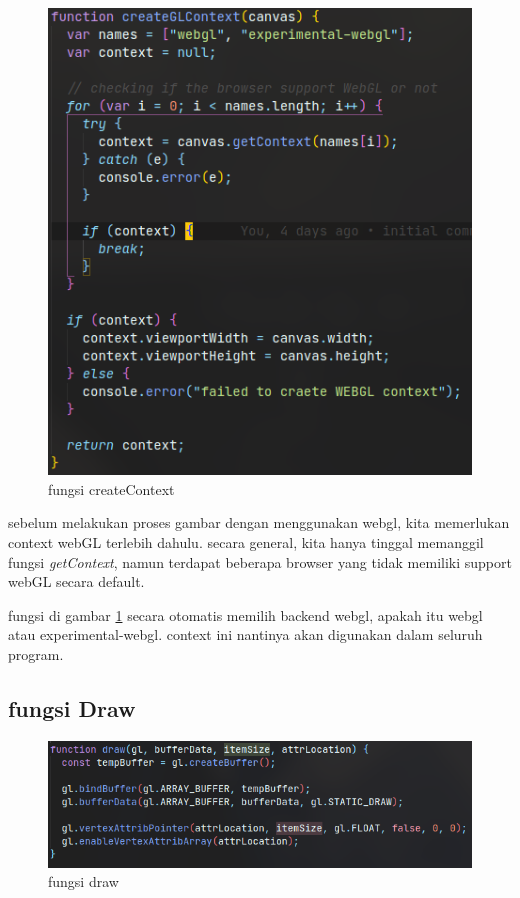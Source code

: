 \begin{figure}[h]
    \centering
    \includegraphics{grafika/createContext.png}
    \caption{fungsi createContext}
    \label{fig: createContext}
\end{figure}

sebelum melakukan proses gambar dengan menggunakan webgl, kita memerlukan context webGL terlebih dahulu.
secara general, kita hanya tinggal memanggil fungsi \emph{getContext}, namun terdapat beberapa browser yang tidak
memiliki support webGL secara default.

fungsi di gambar \ref{fig: createContext} secara otomatis memilih backend webgl, apakah itu webgl atau experimental-webgl.
context ini nantinya akan digunakan dalam seluruh program.

\subsection{fungsi Draw}


\begin{figure}[h]
    \centering
    \includegraphics[width=\textwidth]{grafika/draw.png}
    \caption{fungsi draw}
    \label{fig: draw}
\end{figure}

